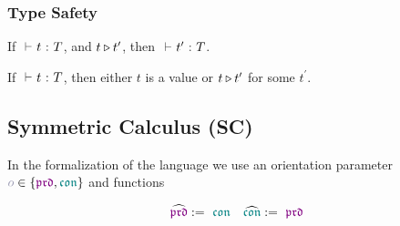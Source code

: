 \begin{prooftree}
\end{prooftree}
\vspace*{0.3cm}

\begin{prooftree}
\end{prooftree}
\vspace*{0.3cm}

\begin{prooftree}
\end{prooftree}

\subsubsection{Type Safety}

\begin{theorem}[Preservation]
  If $\typetmpbc{}{t}{T}$, and $t \evaluatesto t^{\prime}$, then $\typetmpbc{}{t^{\prime}}{T}$.
\end{theorem}

\begin{theorem}[Progress]
  If $\typetmpbc{}{t}{T}$, then either $t$ is a value or $t \evaluatesto t^{\prime}$ for some $t^{\prime}$.
\end{theorem}

\subsection{Symmetric Calculus (SC)}

In the formalization of the language we use an orientation parameter $\pol \in \{ \polprd,\polcon \}$ and functions

\begin{align*}
  \widehat{\polprd}
  :=\ \polcon
  \quad
  \widehat{\polcon}
  :=\ \polprd
\end{align*}

